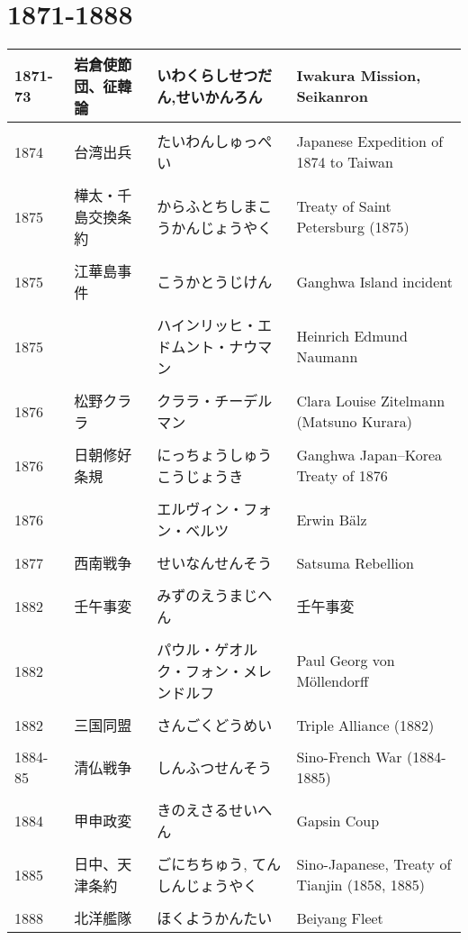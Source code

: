 \documentclass{article}
\begin{document}
\section{1871-1888}
\begin{tabular}{p{1.8cm} | p{3.0cm} | p{4.5cm} | p{7.5cm}}
1871-73 & 岩倉使節団、征韓論 & いわくらしせつだん,せいかんろん & Iwakura Mission, Seikanron \\ \hline \\[-1em]
1874 & 台湾出兵 & たいわんしゅっぺい & Japanese Expedition of 1874 to Taiwan \\ \hline \\[-1em]
1875 & 樺太・千島交換条約 & からふとちしまこうかんじょうやく & Treaty of Saint Petersburg (1875) \\ \hline \\[-1em]
1875 & 江華島事件 & こうかとうじけん & Ganghwa Island incident \\ \hline \\[-1em]
1875 & & ハインリッヒ・エドムント・ナウマン & Heinrich Edmund Naumann \\ \hline \\[-1em]
1876 & 松野クララ & クララ・チーデルマン & Clara Louise Zitelmann (Matsuno Kurara)\\ \hline \\[-1em]
1876 & 日朝修好条規 & にっちょうしゅうこうじょうき & Ganghwa Japan–Korea Treaty of 1876 \\ \hline \\[-1em]
1876 & & エルヴィン・フォン・ベルツ & Erwin Bälz \\ \hline \\[-1em]
1877 & 西南戦争 & せいなんせんそう & Satsuma Rebellion \\ \hline \\[-1em]
1882 & 壬午事変 & みずのえうまじへん & 壬午事変 \\ \hline \\[-1em]
1882 & & パウル・ゲオルク・フォン・メレンドルフ & Paul Georg von Möllendorff \\ \hline \\[-1em]
1882 & 三国同盟 &  さんごくどうめい & Triple Alliance (1882) \\ \hline \\[-1em]
1884-85 & 清仏戦争 & しんふつせんそう & Sino-French War (1884-1885) \\ \hline \\[-1em]
1884 & 甲申政変 & きのえさるせいへん & Gapsin Coup \\ \hline \\[-1em]
1885 & 日中、天津条約 & ごにちちゅう, てんしんじょうやく & Sino-Japanese, Treaty of Tianjin (1858, 1885) \\ \hline \\[-1em]
1888 & 北洋艦隊 & ほくようかんたい & Beiyang Fleet
\end{tabular}
\end{document}
